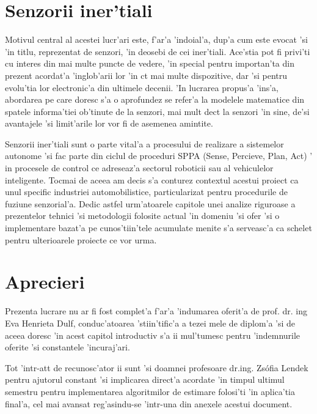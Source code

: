\documentclass[12pt,a4paper,twoside]{report}
\begin{document}
\section{Senzorii iner'tiali}

Motivul central al acestei lucr'ari este, f'ar'a 'indoial'a, dup'a cum este evocat 'si 'in titlu, reprezentat de senzori, 'in deosebi de cei iner'tiali. Ace'stia pot fi privi'ti cu interes din mai multe puncte de vedere, 'in special pentru importan'ta din prezent acordat'a 'inglob'arii lor 'in c\ia t mai multe dispozitive, dar 'si pentru evolu'tia lor electronic'a din ultimele decenii. 'In lucrarea propus'a 'ins'a, abordarea pe care doresc s'a o aprofundez se refer'a la modelele matematice din spatele informa'tiei ob'tinute de la senzori, mai mult dec\ia t la senzori 'in sine, de'si avantajele 'si limit'arile lor vor fi de asemenea amintite. 

\vspace{5px}

Senzorii iner'tiali sunt o parte vital'a a procesului de realizare a sistemelor autonome 'si fac parte din ciclul de proceduri SPPA (Sense, Percieve, Plan, Act) ' in procesele de control ce adreseaz'a sectorul roboticii sau al vehiculelor inteligente. Tocmai de aceea am decis s'a conturez contextul acestui proiect ca unul specific industriei automobilistice, particularizat pentru procedurile de fuziune senzorial'a. Dedic astfel urm'atoarele capitole unei analize riguroase a prezentelor tehnici 'si metodologii folosite actual 'in domeniu 'si ofer 'si o implementare bazat'a pe cunos'tiin'tele acumulate menite s'a serveasc'a ca schelet pentru ulterioarele proiecte ce vor urma.


\section{Aprecieri}

Prezenta lucrare nu ar fi fost complet'a f'ar'a 'indumarea oferit'a de prof. dr. ing Eva Henrieta Dulf, conduc'atoarea 'stiin'tific'a a tezei mele de diplom'a 'si de aceea doresc 'in acest capitol introductiv s'a ii mul'tumesc pentru 'indemnurile oferite 'si constantele 'incuraj'ari.

\vspace{5px}

Tot 'intr-at\ia t de recunosc'ator ii sunt 'si doamnei profesoare dr.ing. Zsófia Lendek pentru ajutorul constant 'si implicarea direct'a acordate 'in timpul ultimul semestru pentru implementarea algoritmilor de estimare folosi'ti 'in aplica'tia final'a, cel mai avansat reg'asindu-se 'intr-una din anexele acestui document.  
\end{document}
